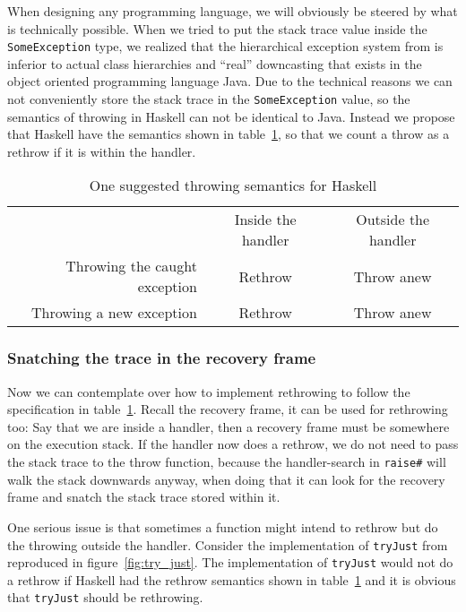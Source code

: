 When designing any programming language, we will obviously be steered by
what is technically possible. When we tried to put the stack trace value
inside the \texttt{SomeException} type, we realized that the
hierarchical exception system from \cite{marlow2006extensible} is
inferior to actual class hierarchies and ``real'' downcasting that exists in the
object oriented programming language Java. Due to the technical reasons
we can not conveniently store the stack trace in the
\texttt{SomeException} value, so the semantics of throwing in Haskell
can not be identical to Java. Instead we propose that Haskell have the
semantics shown in table~\ref{tab:haskell_throw_semantics}, so that we count a throw as a rethrow if
it is within the handler.

\begin{table}[t]
  \centering
  \begin{tabular}{r|c|c|}
    \multicolumn{1}{r}{}
    &  \multicolumn{1}{c}{Inside the handler}
    & \multicolumn{1}{c}{Outside the handler} \\
    \cline{2-3}
    Throwing the caught exception & Rethrow & Throw anew \\
    \cline{2-3}
    Throwing a new exception      & Rethrow & Throw anew \\
    \cline{2-3}
  \end{tabular}
  \caption{One suggested throwing semantics for Haskell}
  \label{tab:haskell_throw_semantics}
\end{table}


\subsubsection{Snatching the trace in the recovery frame}

Now we can contemplate over how to implement rethrowing to follow the
specification in table~\ref{tab:haskell_throw_semantics}. Recall the
recovery frame, it can be used for rethrowing too: Say that we are
inside a handler, then a recovery frame must be somewhere on the
execution stack. If the handler now does a rethrow, we do not need to pass
the stack trace to the throw function, because the handler-search in
\texttt{raise\#} will walk the stack downwards anyway, when doing that
it can look for the recovery frame and snatch the stack trace stored
within it.

One serious issue is that sometimes a function might intend to rethrow
but do the throwing outside the handler. Consider the implementation of
\texttt{tryJust} from \cite{hackage_base_control_exception_base_tryJust}
reproduced in figure~\ref{fig:try_just}. The implementation of \texttt{tryJust} would
not do a rethrow if Haskell had the rethrow semantics shown in
table~\ref{tab:haskell_throw_semantics} and it is obvious that
\texttt{tryJust} should be rethrowing.


